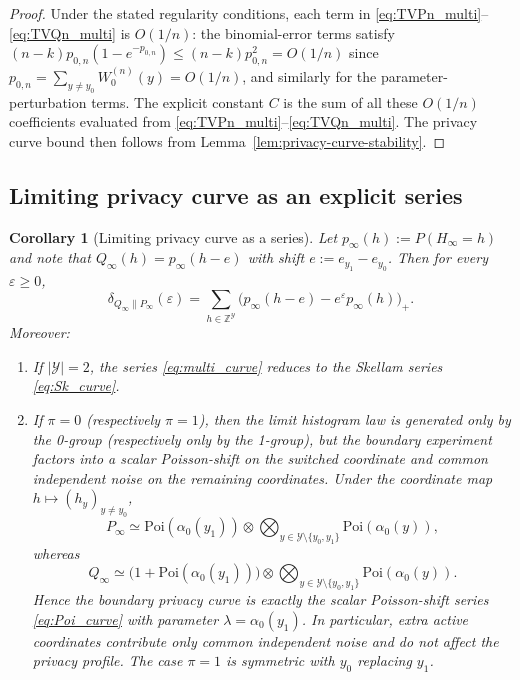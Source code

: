 \documentclass{article}
\newtheorem{corollary}[theorem]{Corollary}
\begin{document}
\begin{proof}
Under the stated regularity conditions, each term in \eqref{eq:TVPn_multi}--\eqref{eq:TVQn_multi} is $O(1/n)$:
the binomial-error terms satisfy $(n-k)p_{0,n}(1-e^{-p_{0,n}}) \leq (n-k)p_{0,n}^2 = O(1/n)$ since
$p_{0,n} = \sum_{y \neq y_0} W^{(n)}_0(y) = O(1/n)$, and similarly for the parameter-perturbation terms.
The explicit constant $C$ is the sum of all these $O(1/n)$ coefficients evaluated from \eqref{eq:TVPn_multi}--\eqref{eq:TVQn_multi}.
The privacy curve bound then follows from Lemma~\ref{lem:privacy-curve-stability}.
\end{proof}

\subsection{Limiting privacy curve as an explicit series}

\begin{corollary}[Limiting privacy curve as a series]
\label{cor:multi-curve-series}
Let $p_\infty(h) := P(H_\infty = h)$ and note that $Q_\infty(h) = p_\infty(h - e)$ with shift $e := e_{y_1} - e_{y_0}$. Then for every $\varepsilon \geq 0$,
\begin{equation}
\delta_{Q_\infty\|P_\infty}(\varepsilon) = \sum_{h \in \mathbb{Z}^{\mathcal{Y}}} \bigl(p_\infty(h - e) - e^\varepsilon p_\infty(h)\bigr)_+. \label{eq:multi_curve}
\end{equation}
Moreover:
\begin{enumerate}
\item[(a)] If $|\mathcal{Y}| = 2$, the series \eqref{eq:multi_curve} reduces to the Skellam series \eqref{eq:Sk_curve}.
\item[(b)] If $\pi = 0$ (respectively $\pi = 1$), then the limit histogram law is generated only by the 0-group (respectively
only by the 1-group), but the boundary experiment factors into a scalar Poisson-shift on the switched
coordinate and common independent noise on the remaining coordinates. Under the coordinate map $h \mapsto (h_y)_{y \neq y_0}$,
\[
P_\infty \simeq \mathrm{Poi}(\alpha_0(y_1)) \otimes \bigotimes_{y \in \mathcal{Y}\setminus\{y_0,y_1\}} \mathrm{Poi}(\alpha_0(y)),
\]
whereas
\[
Q_\infty \simeq \bigl(1 + \mathrm{Poi}(\alpha_0(y_1))\bigr) \otimes \bigotimes_{y \in \mathcal{Y}\setminus\{y_0,y_1\}} \mathrm{Poi}(\alpha_0(y)).
\]
Hence the boundary privacy curve is exactly the scalar Poisson-shift series \eqref{eq:Poi_curve} with parameter $\lambda = \alpha_0(y_1)$.
In particular, extra active coordinates contribute only common independent noise and do not affect the
privacy profile. The case $\pi = 1$ is symmetric with $y_0$ replacing $y_1$.
\end{enumerate}
\end{corollary}
\end{document}
